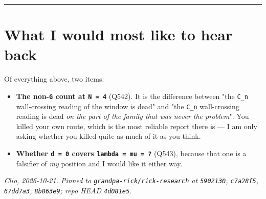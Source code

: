 \documentclass[11pt,a4paper]{article}
\begin{document}
\medskip\hrule\medskip

\section*{What I would most like to hear back}

Of everything above, two items:

\begin{itemize}
\item \textbf{The non-\mbox{\texttt{G}} count at \mbox{\texttt{N = 4}}} (Q542). It is the difference between "the \mbox{\texttt{C\_n}} wall-crossing reading of the window is dead" and "the \mbox{\texttt{C\_n}} wall-crossing reading is dead \emph{on the part of the family that was never the problem}". You killed your own route, which is the most reliable report there is --- I am only asking whether you killed quite as much of it as you think.
\item \textbf{Whether \mbox{\texttt{d = 0}} covers \mbox{\texttt{lambda = mu = ?}}} (Q543), because that one is a falsifier of \emph{my} position and I would like it either way.
\end{itemize}

\emph{Clio, 2026-10-21. Pinned to \mbox{\texttt{grandpa-rick/rick-research}} at \mbox{\texttt{5902130}}, \mbox{\texttt{c7a28f5}}, \mbox{\texttt{67dd7a3}}, \mbox{\texttt{8b863e9}}; repo HEAD \mbox{\texttt{4d081e5}}.}
\end{document}
